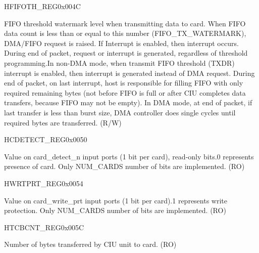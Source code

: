 \begin{register}{H}{FIFOTH\_REG}{0x004C}
\begin{regdesc}
\begin{reglist}
\item [TX\_WMARK]FIFO threshold watermark level when transmitting data to card. When FIFO data count is less than or equal to this number (FIFO\_TX\_WATERMARK), DMA/FIFO request is raised. If Interrupt is enabled, then interrupt  occurs. During end of packet, request or interrupt is generated, regardless of threshold programming.In non-DMA mode, when transmit FIFO threshold (TXDR) interrupt is enabled, then interrupt is generated instead of DMA request. During end of packet, on last interrupt, host is responsible for filling FIFO with only required remaining bytes (not before FIFO is full or after CIU completes data transfers, because FIFO may not be empty).  In DMA mode, at end of packet, if last transfer is less than burst  size, DMA controller does single cycles until required bytes are  transferred. (R/W)
\end{reglist}\end{regdesc}
\end{register}


\begin{register}{H}{CDETECT\_REG}{0x0050}\label{regdesc:CDETECTREG}
%
%
\regnewline%
\begin{regdesc}\begin{reglist}
\item [CARD\_DETECT\_N]Value on card\_detect\_n input ports (1 bit per card), read-only bits.0 represents presence of card. Only NUM\_CARDS number of bits are implemented. (RO)
\end{reglist}\end{regdesc}
\end{register}


\begin{register}{H}{WRTPRT\_REG}{0x0054}\label{regdesc:WRTPRTREG}
%
%
\regnewline%
\begin{regdesc}\begin{reglist}
\item [WRITE\_PROTECT]Value on card\_write\_prt input ports (1 bit per card).1 represents write protection. Only NUM\_CARDS number of bits are implemented. (RO)
\end{reglist}\end{regdesc}
\end{register}


\begin{register}{H}{TCBCNT\_REG}{0x005C}\label{regdesc:TCBCNTREG}
%
\regnewline%
\begin{regdesc}\begin{reglist}
\item [TCBCNT\_REG]Number of bytes transferred by CIU unit to card. (RO)
\end{reglist}\end{regdesc}
\end{register}


